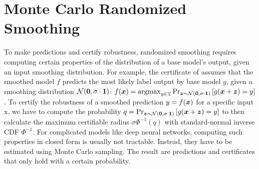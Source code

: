 \clearpage

\section{Monte Carlo Randomized Smoothing}\label{section:monte_carlo}
To make predictions and certify robustness, randomized smoothing requires computing certain properties of the distribution of a base model's output, given an input smoothing distribution.
For example, the certificate of \citet{Cohen2019} assumes that the smoothed model $f$ predicts 
the most likely label output by base model $g$, given a smoothing distribution 
$\mathcal{N}(\mathbf{0}, \sigma \cdot \bm{1})$:
$f({\bm{x}}) = \mathrm{argmax}_{y \in {\mathbb{Y}}} \Pr_{{\bm{z}} \sim \mathcal{N}(\mathbf{0}, \sigma \cdot \bm{1})}\left[g({\bm{x}} + {\bm{z}}) = y\right]$.
To certify the robustness of a smoothed prediction $y = f({\bm{x}})$ for a specific input x, we have to compute the
probability $q = \Pr_{{\bm{z}} \sim \mathcal{N}(\mathbf{0}, \sigma \cdot \bm{1})}\left[g({\bm{x}} + {\bm{z}}) = y\right]$ to then calculate the maximum certifiable radius $\sigma \Phi^{-1}(q)$ with standard-normal inverse CDF $\Phi^{-1}$.
For complicated models like deep neural networks, computing such properties in closed form is usually not tractable.
Instead, they have to be estimated using Monte Carlo sampling.
The result are predictions and certificates that only hold with a certain probability.

